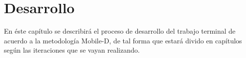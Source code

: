 \chapter{Desarrollo}

En éste capítulo se describirá el proceso de desarrollo del trabajo terminal de acuerdo a la metodología Mobile-D, de tal forma que estará divido en capítulos según las iteraciones que se vayan realizando.\par